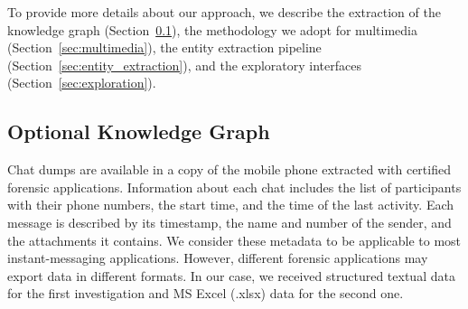 
To provide more details about our approach, we describe the extraction of the knowledge graph (Section~\ref{sec:metadata_kg}), the methodology we adopt for multimedia (Section~\ref{sec:multimedia}), the entity extraction pipeline (Section~\ref{sec:entity_extraction}), and the exploratory interfaces (Section~\ref{sec:exploration}).


        
    \subsection{Optional Knowledge Graph} \label{sec:metadata_kg}
Chat dumps are available in a copy of the mobile phone extracted with certified forensic applications. %
Information about each chat includes the list of participants with their phone numbers, the start time, and the time of the last activity. Each message is described by its timestamp, the name and number of the sender, and the attachments it contains.
We consider these metadata to be applicable to most instant-messaging applications. 
However, different forensic applications may export data in different formats. In our case, we received structured textual data for the first investigation and MS Excel (.xlsx) data for the second one.

